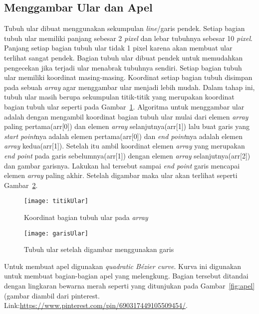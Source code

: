 \subsection{Menggambar Ular dan Apel}
Tubuh ular dibuat menggunakan sekumpulan \textit{line}/garis pendek. Setiap bagian tubuh ular memiliki panjang sebesar 2 \textit{pixel} dan lebar tubuhnya sebesar 10 \textit{pixel}. Panjang setiap bagian tubuh ular tidak 1 pixel karena akan membuat ular terlihat sangat pendek. Bagian tubuh ular dibuat pendek untuk memudahkan pengecekan jika terjadi ular menabrak tubuhnya sendiri. Setiap bagian tubuh ular memiliki koordinat masing-masing. Koordinat setiap bagian tubuh disimpan pada sebuah \textit{array} agar menggambar ular menjadi lebih mudah. Dalam tahap ini, tubuh ular masih berupa sekumpulan titik-titik yang merupakan koordinat bagian tubuh ular seperti pada Gambar~\ref{fig:titikUlar}. Algoritma untuk menggambar ular adalah dengan mengambil koordinat bagian tubuh ular mulai dari elemen \textit{array} paling pertama(arr[0]) dan elemen \textit{array} selanjutnya(arr[1]) lalu buat garis yang \textit{start point}nya adalah elemen pertama(arr[0]) dan \textit{end point}nya adalah elemen \textit{array} kedua(arr[1]). Setelah itu ambil koordinat elemen \textit{array} yang merupakan \textit{end point} pada garis sebelumnya(arr[1]) dengan elemen \textit{array} selanjutnya(arr[2]) dan gambar garisnya. Lakukan hal tersebut sampai \textit{end point} garis mencapai elemen \textit{array} paling akhir. Setelah digambar maka ular akan terlihat seperti Gambar~\ref{fig:garisUlar}.

\begin{figure}[H]
	\centering  
	\texttt{[image: titikUlar]}  
	\caption[Koordinat bagian tubuh ular pada \textit{array}]{Koordinat bagian tubuh ular pada \textit{array}}
	\label{fig:titikUlar} 
\end{figure}

\begin{figure}[H]
	\centering  
	\texttt{[image: garisUlar]}  
	\caption[Tubuh ular setelah digambar menggunakan garis]{Tubuh ular setelah digambar menggunakan garis}
	\label{fig:garisUlar} 
\end{figure}

Untuk membuat apel digunakan \textit{quadratic B\'ezier curve}. Kurva ini digunakan untuk membuat bagian-bagian apel yang melengkung. Bagian tersebut ditandai dengan lingkaran bewarna merah seperti yang ditunjukan pada Gambar~\ref{fig:apel}(gambar diambil dari pinterest. Link:\url{https://www.pinterest.com/pin/690317449105509454/}.

